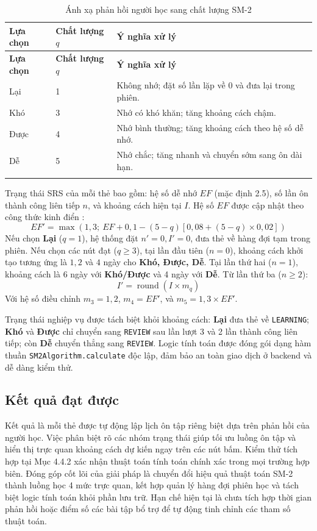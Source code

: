 \documentclass[../DoAn.tex]{subfiles}
\begin{document}
\begin{longtable}{|p{2.5cm}|p{3cm}|p{8cm}|}
\hline
\textbf{Lựa chọn} & \textbf{Chất lượng \(q\)} & \textbf{Ý nghĩa xử lý} \\
\hline
\endfirsthead
\hline
\textbf{Lựa chọn} & \textbf{Chất lượng \(q\)} & \textbf{Ý nghĩa xử lý} \\
\hline
\endhead
Lại & 1 & Không nhớ; đặt số lần lặp về 0 và đưa lại trong phiên. \\
\hline
Khó & 3 & Nhớ có khó khăn; tăng khoảng cách chậm. \\
\hline
Được & 4 & Nhớ bình thường; tăng khoảng cách theo hệ số dễ nhớ. \\
\hline
Dễ & 5 & Nhớ chắc; tăng nhanh và chuyển sớm sang ôn dài hạn. \\
\hline
\caption{Ánh xạ phản hồi người học sang chất lượng SM-2}
\label{table:5.2}\\
\end{longtable}

Trạng thái SRS của mỗi thẻ bao gồm: hệ số dễ nhớ \(EF\) (mặc định 2.5), số lần ôn thành công liên tiếp \(n\), và khoảng cách hiện tại \(I\). Hệ số \(EF\) được cập nhật theo công thức kinh điển \cite{wozniak1990optimization}:
\[
EF' = \max\left(1{,}3;\ EF + 0{,}1 - (5-q)\left[0{,}08 + (5-q)\times0{,}02\right]\right)
\]
Nếu chọn \textbf{Lại} (\(q=1\)), hệ thống đặt \(n'=0, I'=0\), đưa thẻ về hàng đợi tạm trong phiên. Nếu chọn các nút đạt (\(q \geq 3\)), tại lần đầu tiên (\(n=0\)), khoảng cách khởi tạo tương ứng là \(1, 2\) và \(4\) ngày cho \textbf{Khó, Được, Dễ}. Tại lần thứ hai (\(n=1\)), khoảng cách là 6 ngày với \textbf{Khó/Được} và 4 ngày với \textbf{Dễ}. Từ lần thứ ba (\(n \geq 2\)):
\[
I' = \operatorname{round}(I\times m_q)
\]
Với hệ số điều chỉnh \(m_3 = 1{,}2\), \(m_4 = EF'\), và \(m_5 = 1{,}3\times EF'\). 

Trạng thái nghiệp vụ được tách biệt khỏi khoảng cách: \textbf{Lại} đưa thẻ về \texttt{LEARNING}; \textbf{Khó} và \textbf{Được} chỉ chuyển sang \texttt{REVIEW} sau lần lượt 3 và 2 lần thành công liên tiếp; còn \textbf{Dễ} chuyển thẳng sang \texttt{REVIEW}. Logic tính toán được đóng gói dạng hàm thuần \texttt{SM2Algorithm.calculate} độc lập, đảm bảo an toàn giao dịch ở backend và dễ dàng kiểm thử.

\subsection{Kết quả đạt được}
\label{subsection:5.2.3}

Kết quả là mỗi thẻ được tự động lập lịch ôn tập riêng biệt dựa trên phản hồi của người học. Việc phân biệt rõ các nhóm trạng thái giúp tối ưu luồng ôn tập và hiển thị trực quan khoảng cách dự kiến ngay trên các nút bấm. Kiểm thử tích hợp tại Mục 4.4.2 xác nhận thuật toán tính toán chính xác trong mọi trường hợp biên. Đóng góp cốt lõi của giải pháp là chuyển đổi hiệu quả thuật toán SM-2 thành luồng học 4 mức trực quan, kết hợp quản lý hàng đợi phiên học và tách biệt logic tính toán khỏi phần lưu trữ. Hạn chế hiện tại là chưa tích hợp thời gian phản hồi hoặc điểm số các bài tập bổ trợ để tự động tinh chỉnh các tham số thuật toán.
\end{document}
